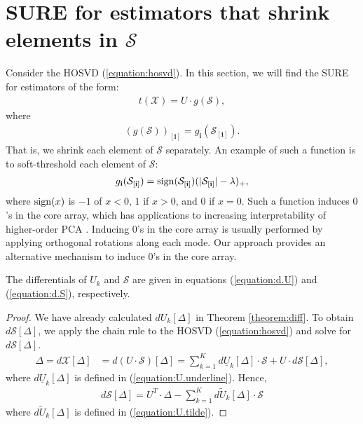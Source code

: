 \section{SURE for estimators that shrink elements in $\mathcal{S}$}
\label{sec:sure.s.shrink}
Consider the HOSVD (\ref{equation:hosvd}). In this section, we will find the SURE for estimators of the form:
\begin{align}
\label{equation:hose.s}
t(\mathcal{X}) = U \cdot g(\mathcal{S}),
\end{align}
where
\begin{align*}
(g(\mathcal{S}))_{[\mathbf{i}]} = g_{\mathbf{i}}(\mathcal{S}_{[\mathbf{i}]}).
\end{align*}
That is, we shrink each element of $\mathcal{S}$ separately. An example of such a function is to soft-threshold each element of $\mathcal{S}$:
\begin{align*}
g_{\mathbf{i}}(\mathcal{S}_{[\mathbf{i}]}) = \operatorname*{sign}(\mathcal{S}_{[\mathbf{i}]})(|\mathcal{S}_{[\mathbf{i}]}| - \lambda)_+,
\end{align*}
where $\operatorname*{sign}(x)$ is $-1$ of $x < 0$, $1$ if $x > 0$, and $0$ if $x = 0$. Such a function induces $0$'s in the core array, which has applications to increasing interpretability of higher-order PCA \citep{henrion1993body,kiers1997uniqueness,murakami1998case,andersson1999general,de2001independent,martin2008jacobi}. Inducing $0$'s in the core array is usually performed by applying orthogonal rotations along each mode. Our approach provides an alternative mechanism to induce $0$'s in the core array.



\begin{theorem}
The differentials of $U_k$ and $\mathcal{S}$ are given in equations (\ref{equation:d.U}) and (\ref{equation:d.S}), respectively.
\end{theorem}
\begin{proof}
We have already calculated $dU_k[\Delta]$ in Theorem \ref{theorem:diff}. To obtain $d\mathcal{S}[\Delta]$, we apply the chain rule to the HOSVD (\ref{equation:hosvd}) and solve for $d\mathcal{S}[\Delta]$.
\begin{align*}
\Delta = d\mathcal{X}[\Delta] &= d(U\cdot \mathcal{S})[\Delta] =\sum_{k=1}^Kd\underline{U}_k[\Delta] \cdot \mathcal{S} + U \cdot d\mathcal{S}[\Delta],
\end{align*}
where $d\underline{U}_k[\Delta]$ is defined in (\ref{equation:U.underline}). Hence,
\begin{align}
\label{equation:d.S}
d\mathcal{S}[\Delta] =  U^T \cdot \Delta - \sum_{k=1}^K d\tilde{U}_k[\Delta]\cdot \mathcal{S} 
\end{align}
where $d\tilde{U}_k[\Delta]$ is defined in (\ref{equation:U.tilde}).
\end{proof}

